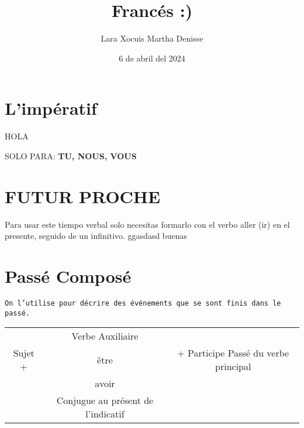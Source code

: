 \documentclass[letterpaper,12pt]{article}
\title {\textbf{Francés :)}}
\author{Lara Xocuis Martha Denisse}
\date{6 de abril del 2024}
\begin{document}
\maketitle
\thispagestyle{empty}
\newpage
\setcounter{page}{1}
\pagestyle{headings}

\begin{sloppypar} 
\section{L'impératif}
HOLA 

SOLO PARA: \textbf{TU, NOUS, VOUS} 



\section{FUTUR PROCHE}
Para usar este tiempo verbal solo necesitas formarlo con el verbo aller (ir) en el presente, seguido de un infinitivo. ggasdasd buenas

\section{Passé Composé}
\texttt{On l'utilise pour décrire des événements que se sont finis dans le passé.}
\begin{center}
    \begin{tabular}{|c|c|c|}\hline
        & Verbe Auxiliaire & \\
        Sujet + & être & + Participe Passé du verbe principal\\
        & avoir & \\
        & Conjugue au présent de l'indicatif & \\
        \hline
    \end{tabular}
\end{center}


\end{sloppypar}
\end{document}
